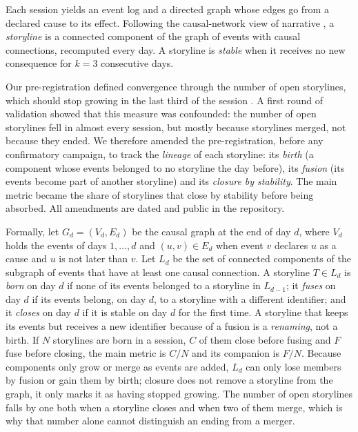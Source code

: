 \documentclass[12pt]{article}
\begin{document}
Each session yields an event log and a directed graph whose edges go from a
declared cause to its effect. Following the causal-network view of
narrative \parencite{trabasso1985}, a \emph{storyline} is a connected
component of the graph of events with causal connections, recomputed every
day. A storyline is \emph{stable} when it receives no new consequence for
$k = 3$ consecutive days.

Our pre-registration defined convergence through the number of open
storylines, which should stop growing in the last third of the session
\parencite{nosek2018}. A first round of validation showed that this measure
was confounded: the number of open storylines fell in almost every session,
but mostly because storylines merged, not because they ended. We therefore
amended the pre-registration, before any confirmatory campaign, to track the
\emph{lineage} of each storyline: its \emph{birth} (a component whose events
belonged to no storyline the day before), its \emph{fusion} (its events
become part of another storyline) and its \emph{closure by stability}. The
main metric became the share of storylines that close by stability before
being absorbed. All amendments are dated and public in the repository.

Formally, let $G_d = (V_d, E_d)$ be the causal graph at the end of day $d$,
where $V_d$ holds the events of days $1,\dots,d$ and $(u, v) \in E_d$ when
event $v$ declares $u$ as a cause and $u$ is not later than $v$. Let
$L_d$ be the set of connected components of the subgraph of events
that have at least one causal connection. A storyline $T \in L_d$
is \emph{born} on day $d$ if none of its events belonged to a storyline in
$L_{d-1}$; it \emph{fuses} on day $d$ if its events belong, on day
$d$, to a storyline with a different identifier; and it \emph{closes} on day
$d$ if it is stable on day $d$ for the first time. A storyline that keeps its
events but receives a new identifier because of a fusion is a
\emph{renaming}, not a birth. If $N$ storylines are born in a session, $C$ of
them close before fusing and $F$ fuse before closing, the main metric is
$C/N$ and its companion is $F/N$. Because components only grow or merge as
events are added, $L_d$ can only lose members by fusion or gain
them by birth; closure does not remove a storyline from the graph, it only
marks it as having stopped growing. The number of open storylines falls by
one both when a storyline closes and when two of them merge, which is why
that number alone cannot distinguish an ending from a merger.
\end{document}
